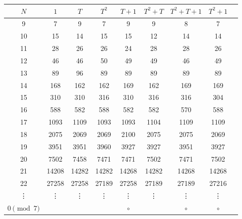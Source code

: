 \documentclass[10pt,reqno]{amsproc}
\newcommand{\1}{\mathds{1}}	%
\theoremstyle{definition}
\theoremstyle{remark}
\newcommand{\myg}[1]{\textcolor{mygreen}{#1}}
\newcommand{\myb}[1]{\textcolor{myblue}{#1}}
\begin{document}
\begin{table}[h!]
\centering
\begin{tabular}{c|cccccccc}
\toprule
\textbf{$N$} & \textbf{$1$} & \textbf{$T$} & \textbf{$T^2$} & \textbf{$T+1$} & \textbf{$T^2+T$} & \textbf{$T^2+T+1$} & \textbf{$T^2+1$} \\
\midrule
9  & \myg{7}     & \myb{9}     & \myg{7}     & \myb{9}     & \myb{9}     & {8}     & \myg{7}     \\
10 & \myg{15}    & \myb{14}    & \myg{15}    & \myg{15}    & {12}    & \myb{14}    & \myb{14}    \\
11 & \myg{28}    & \myb{26}    & \myb{26}   & {24}   & \myg{28}     & \myg{28}     & \myb{26}    \\
12 & \myg{46}    & \myg{46}     & {50}   & \myb{49}   & \myb{49}    & \myg{46}     & \myb{49}    \\
13 & \myb{89}   & {96}    & \myb{89}   & \myb{89}   & \myb{89}    & \myb{89}    & \myb{89}    \\
14 & {168}  & \myg{162}    & \myg{162}   & \myb{169}  & \myg{162}    & \myb{169}   & \myb{169}   \\
15 & \myg{310}   & \myg{310}    & \myb{316}  & \myg{310}   & \myb{316}   & \myb{316}   & {304}   \\
16 & \myg{588}   & \myb{582}   & \myg{588}   & \myb{582}  & \myb{582}   & {570}   & \myg{588}    \\
17 & \myg{1093}  & \myb{1109}  & \myg{1093}  & \myg{1093}  & {1104}  & \myb{1109}  & \myb{1109}  \\
18 & \myg{2075}  & \myb{2069}  & \myb{2069} & {2100} & \myg{2075}   & \myg{2075}   & \myb{2069}  \\
19 & \myg{3951}  & \myg{3951}   & {3960} & \myb{3927} & \myb{3927}  & \myg{3951}   & \myb{3927}  \\
20 & \myg{7502}  & {7458}  & \myb{7471} & \myb{7471} & \myg{7502}   & \myb{7471}  & \myg{7502}   \\
21 & {14208}& \myg{14282}  & \myg{14282} & \myb{14268}& \myg{14282}  & \myb{14268} & \myb{14268} \\
22 & \myg{27258} & \myg{27258}  & \myb{27189}& \myg{27258} & \myb{27189} & \myb{27189} & {27216} \\
\vdots & \vdots & \vdots & \vdots & \vdots & \vdots & \vdots & \vdots \\
\midrule
$0 \pmod{7}$ &   & \myg{\ding{73}}    & \myg{\ding{73}}   & \myb{$\circ$}  & \myg{\ding{73}}    & \myb{$\circ$}   & \myb{$\circ$}   \\

\end{tabular}
\end{table}
\end{document}
